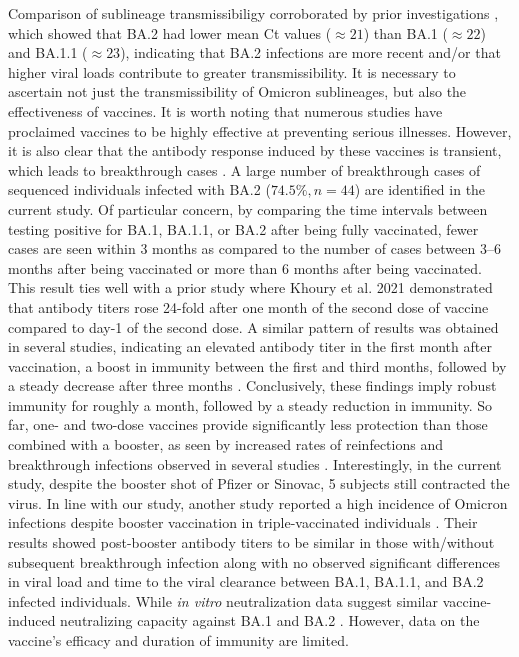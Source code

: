 Comparison of sublineage transmissibiligy corroborated by prior investigations \citep{qassim2022effects, lentini2022monitoring, kirsebom2022covid}, which showed that BA.2 had lower mean Ct values ($\approx21$) than BA.1 ($\approx22$) and BA.1.1 ($\approx23$), indicating that BA.2 infections are more recent and/or that higher viral loads contribute to greater transmissibility.
It is necessary to ascertain not just the transmissibility of Omicron sublineages, but also the effectiveness of vaccines.
It is worth noting that numerous studies have proclaimed vaccines to be highly effective at preventing serious illnesses.
However, it is also clear that the antibody response induced by these vaccines is transient, which leads to breakthrough cases \citep{haque2022mitigating, bruel2022serum, seaman2022vaccine}.
A large number of breakthrough cases of sequenced individuals infected with BA.2 ($74.5\%, n=44$) are identified in the current study.
Of particular concern, by comparing the time intervals between testing positive for BA.1, BA.1.1, or BA.2 after being fully vaccinated, fewer cases are seen within 3 months as compared to the number of cases between 3--6 months after being vaccinated or more than 6 months after being vaccinated.
This result ties well with a prior study where Khoury et al. 2021 \citep{khoury2021covid} demonstrated that antibody titers rose 24-fold after one month of the second dose of vaccine compared to day-1 of the second dose.
A similar pattern of results was obtained in several studies, indicating an elevated antibody titer in the first month after vaccination, a boost in immunity between the first and third months, followed by a steady decrease after three months \citep{chemaitelly2021waning, levin2021waning}.
Conclusively, these findings imply robust immunity for roughly a month, followed by a steady reduction in immunity.
So far, one- and two-dose vaccines provide significantly less protection than those combined with a booster, as seen by increased rates of reinfections and breakthrough infections observed in several studies \citep{healthline-covid19-vaccines, stasi2022sars}.
Interestingly, in the current study, despite the booster shot of Pfizer or Sinovac, 5 subjects still contracted the virus.
In line with our study, another study reported a high incidence of Omicron infections despite booster vaccination in triple-vaccinated individuals \citep{marking2022high}. 
Their results showed post-booster antibody titers to be similar in those with/without subsequent breakthrough infection along with no observed significant differences in viral load and time to the viral clearance between BA.1, BA.1.1, and BA.2 infected individuals.
While \textit{in vitro} neutralization data suggest similar vaccine-induced neutralizing capacity against BA.1 and BA.2 \citep{evans2022neutralization}.
However, data on the vaccine's efficacy and duration of immunity are limited.

